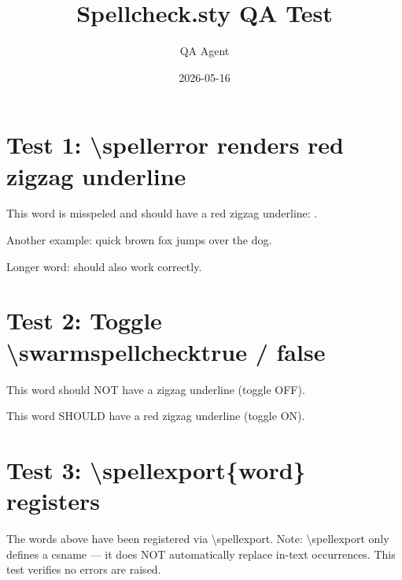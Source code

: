 \documentclass{article}
\title{Spellcheck.sty QA Test}
\author{QA Agent}
\date{2026-05-16}
\begin{document}
\maketitle

\section*{Test 1: \textbackslash spellerror renders red zigzag underline}

This word is misspeled and should have a red zigzag underline: .

Another example:  quick brown fox jumps over the  dog.

Longer word:  should also work correctly.

\newpage

\section*{Test 2: Toggle \textbackslash swarmspellchecktrue / false}

\swarmspellcheckfalse
This  word should NOT have a zigzag underline (toggle OFF).

\swarmspellchecktrue
This  word SHOULD have a red zigzag underline (toggle ON).

\newpage

\section*{Test 3: \textbackslash spellexport\{word\} registers}


The words above have been registered via \textbackslash spellexport.  Note:
\textbackslash spellexport only defines a csname — it does NOT automatically
replace in-text occurrences.  This test verifies no errors are raised.
\end{document}
